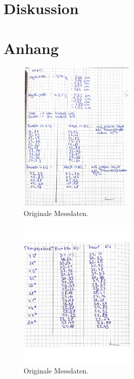 \section{Diskussion}
\label{sec:Diskussion}



\section{Anhang}
\label{sec:Anhang}

\begin{figure}[H]
    \centering
    \includegraphics[width=0.5\textwidth]{Dateien/V107daten1.jpg}
    \caption{Originale Messdaten.}
    \label{fig:origDaten1}
\end{figure}
\begin{figure}[H]
    \centering
    \includegraphics[width=0.5\textwidth]{Dateien/V107daten2.jpg}
    \caption{Originale Messdaten.}
    \label{fig:origDaten2}
\end{figure}